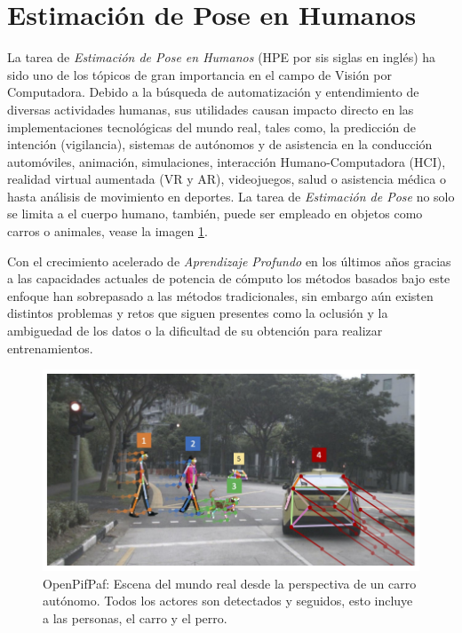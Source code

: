 \section{Estimación de Pose en Humanos}


La tarea de \textit{Estimación de Pose en Humanos} (HPE por sis siglas en inglés) ha sido uno de los
tópicos de gran importancia en
el campo de Visión por Computadora. Debido a la búsqueda de automatización y entendimiento de
diversas actividades humanas, sus utilidades causan impacto directo en las implementaciones
tecnológicas del mundo real, tales como, la predicción de intención (vigilancia), sistemas de
autónomos y de asistencia en la conducción automóviles, animación, simulaciones,
interacción Humano-Computadora (HCI), realidad virtual
aumentada (VR y AR), videojuegos, salud o asistencia médica o hasta análisis de movimiento en
deportes. La tarea de \textit{Estimación de Pose} no solo se limita a el cuerpo
humano, también, puede ser empleado en objetos como carros o animales, vease la imagen \ref{fig:PE-track}.

Con el crecimiento acelerado de \textit{Aprendizaje Profundo} en los últimos años gracias a las
capacidades actuales de potencia de cómputo los métodos basados bajo este enfoque han sobrepasado
a las métodos tradicionales, sin embargo aún existen distintos problemas y retos que siguen presentes
como la oclusión y la ambiguedad de los datos o la dificultad de su obtención para realizar
entrenamientos.

\begin{figure}[ht!]
    \centering
    \includegraphics[width=0.4 \textwidth]{Chapters/1. HPE_LUNG/figures/openpifpaf.png}
    \caption{OpenPifPaf: Escena del mundo real desde la perspectiva de un carro autónomo. Todos los
             actores son detectados y seguidos, esto incluye a las personas, el carro y el perro.
             \cite{DBLP:journals/corr/abs-2103-02440}}
    \label{fig:PE-track}
\end{figure}

